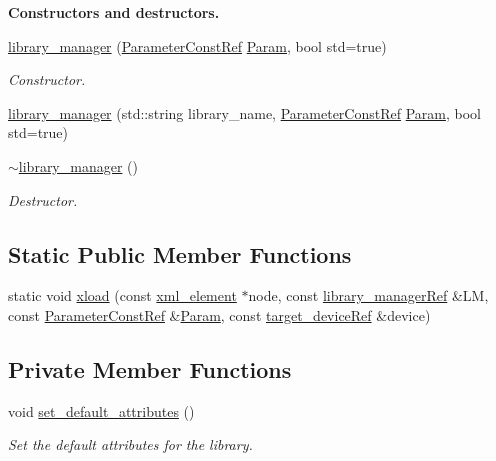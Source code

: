 \begin{Indent}\textbf{ Constructors and destructors.}\par
\begin{DoxyCompactItemize}
\item 
\hyperlink{classlibrary__manager_af71a5b63e8589cc3e9d81e2748f571b5}{library\+\_\+manager} (\hyperlink{Parameter_8hpp_a37841774a6fcb479b597fdf8955eb4ea}{Parameter\+Const\+Ref} \hyperlink{classlibrary__manager_a456f9321dfda42ab5d48c9636ab43320}{Param}, bool std=true)
\begin{DoxyCompactList}\small\item\em Constructor. \end{DoxyCompactList}\item 
\hyperlink{classlibrary__manager_adf29fa335541787d0fea1a8b0db9dcc6}{library\+\_\+manager} (std\+::string library\+\_\+name, \hyperlink{Parameter_8hpp_a37841774a6fcb479b597fdf8955eb4ea}{Parameter\+Const\+Ref} \hyperlink{classlibrary__manager_a456f9321dfda42ab5d48c9636ab43320}{Param}, bool std=true)
\item 
\hyperlink{classlibrary__manager_a51dd14df3ed399e17d62fddfacf54557}{$\sim$library\+\_\+manager} ()
\begin{DoxyCompactList}\small\item\em Destructor. \end{DoxyCompactList}\end{DoxyCompactItemize}
\end{Indent}
\subsection*{Static Public Member Functions}
\begin{DoxyCompactItemize}
\item 
static void \hyperlink{classlibrary__manager_a2256397a16a3d834c1cf9921824316be}{xload} (const \hyperlink{classxml__element}{xml\+\_\+element} $\ast$node, const \hyperlink{library__manager_8hpp_aacc6d633b0aa80ecfeb1180fd480ae68}{library\+\_\+manager\+Ref} \&LM, const \hyperlink{Parameter_8hpp_a37841774a6fcb479b597fdf8955eb4ea}{Parameter\+Const\+Ref} \&\hyperlink{classlibrary__manager_a456f9321dfda42ab5d48c9636ab43320}{Param}, const \hyperlink{target__device_8hpp_acedb2b7a617e27e6354a8049fee44eda}{target\+\_\+device\+Ref} \&device)
\end{DoxyCompactItemize}
\subsection*{Private Member Functions}
\begin{DoxyCompactItemize}
\item 
void \hyperlink{classlibrary__manager_a4e550de1a50f9e84f65c2fdd930f02b8}{set\+\_\+default\+\_\+attributes} ()
\begin{DoxyCompactList}\small\item\em Set the default attributes for the library. \end{DoxyCompactList}\end{DoxyCompactItemize}
